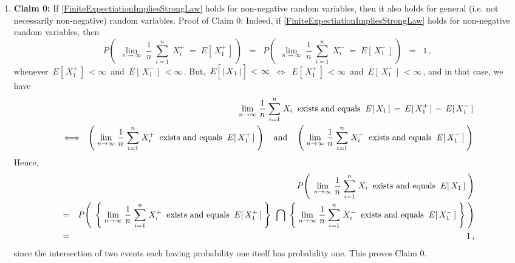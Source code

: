 \begin{enumerate}
\item

\noindent
\textbf{Claim 0:}\quad
If \eqref{FiniteExpectiationImpliesStrongLaw} holds for non-negative random variables,
then it also holds for general (i.e. not necessarily non-negative) random variables.
\vskip 0.3cm
\noindent
Proof of Claim 0:\quad
Indeed, if \eqref{FiniteExpectiationImpliesStrongLaw} holds for non-negative random variables, then
\begin{equation*}
P\!\left(\;\,
	\underset{n\rightarrow\infty}{\lim}\;
	\dfrac{1}{n}\;\overset{n}{\underset{i=1}{\sum}}\;X_{i}^{+} \;=\; E[\,X_{1}^{+}\,]
	\,\right)
\;\; = \;\;
	P\!\left(\;\,
		\underset{n\rightarrow\infty}{\lim}\;
		\dfrac{1}{n}\;\overset{n}{\underset{i=1}{\sum}}\;X_{i}^{-} \;=\; E[\,X_{1}^{-}\,]
		\,\right)
\;\; = \;\; 1\,,
\end{equation*}
whenever \,$E[\,X_{1}^{+}\,] \, < \infty$\, and \,$E[\,X_{1}^{-}\,] \, < \infty$\,.
But,
\,$E\!\left[\,\vert\,\overset{{\color{white}.}}{X}_{1}\,\vert\,\right] \,<\, \infty$\,
$\Longleftrightarrow$
\,$E[\,X_{1}^{+}\,] \, < \infty$\, and \,$E[\,X_{1}^{-}\,] \, < \infty$\,,
and in that case, we have
\begin{eqnarray*}
&&
	\underset{n\rightarrow\infty}{\lim}\;
		\dfrac{1}{n}\;\overset{n}{\underset{i=1}{\sum}}\;X_{i}
		\;\;\textnormal{exists and equals}\;\;
		E[\,X_{1}\,] \,=\, E[\,X_{1}^{+}\,] \, - \, E[\,X_{1}^{-}\,]
\\
& \Longleftrightarrow &
	\left(\;
		\underset{n\rightarrow\infty}{\lim}\;
		\dfrac{1}{n}\;\overset{n}{\underset{i=1}{\sum}}\;X_{i}^{+}
		\;\;\textnormal{exists and equals}\;\;
		E[\,X_{1}^{+}\,]
		\;\right)
	\quad\textnormal{and}\quad
	\left(\;
		\underset{n\rightarrow\infty}{\lim}\;
		\dfrac{1}{n}\;\overset{n}{\underset{i=1}{\sum}}\;X_{i}^{-}
		\;\;\textnormal{exists and equals}\;\;
		E[\,X_{1}^{-}\,]
		\;\right)
\end{eqnarray*}
Hence,
\begin{eqnarray*}
&&
	P\!\left(\;\,
		\underset{n\rightarrow\infty}{\lim}\;
		\dfrac{1}{n}\;\overset{n}{\underset{i=1}{\sum}}\;X_{i}
		\;\;\textnormal{exists and equals}\;\;
		E[\,X_{1}\,]
		\;\right)
\\
& = &
	P\!\left(\;\,
		\left\{\;
			\underset{n\rightarrow\infty}{\lim}\;
			\dfrac{1}{n}\;\overset{n}{\underset{i=1}{\sum}}\;X_{i}^{+}
			\;\;\textnormal{exists and equals}\;\;
			E[\,X_{1}^{+}\,]
			\;\right\}
	\;\,\bigcap\;
		\left\{\;
			\underset{n\rightarrow\infty}{\lim}\;
			\dfrac{1}{n}\;\overset{n}{\underset{i=1}{\sum}}\;X_{i}^{-}
			\;\;\textnormal{exists and equals}\;\;
			E[\,X_{1}^{-}\,]
			\;\right\}
		\;\right)
\\
& = &
	1\,,
\end{eqnarray*}
since the intersection of two events each having probability one itself has probability one.
This proves Claim 0.


\end{enumerate}
